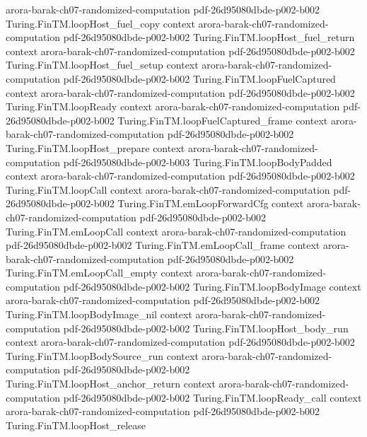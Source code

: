 \begin{theorem}
  {arora-barak-ch07-randomized-computation}
  {pdf-26d95080dbde-p002-b002}
\proofstep
  {Turing.FinTM.loopHost_fuel_copy}
  {context}
  {arora-barak-ch07-randomized-computation}
  {pdf-26d95080dbde-p002-b002}
\proofstep
  {Turing.FinTM.loopHost_fuel_return}
  {context}
  {arora-barak-ch07-randomized-computation}
  {pdf-26d95080dbde-p002-b002}
\proofstep
  {Turing.FinTM.loopHost_fuel_setup}
  {context}
  {arora-barak-ch07-randomized-computation}
  {pdf-26d95080dbde-p002-b002}
\proofstep
  {Turing.FinTM.loopFuelCaptured}
  {context}
  {arora-barak-ch07-randomized-computation}
  {pdf-26d95080dbde-p002-b002}
\proofstep
  {Turing.FinTM.loopReady}
  {context}
  {arora-barak-ch07-randomized-computation}
  {pdf-26d95080dbde-p002-b002}
\proofstep
  {Turing.FinTM.loopFuelCaptured_frame}
  {context}
  {arora-barak-ch07-randomized-computation}
  {pdf-26d95080dbde-p002-b002}
\proofstep
  {Turing.FinTM.loopHost_prepare}
  {context}
  {arora-barak-ch07-randomized-computation}
  {pdf-26d95080dbde-p002-b003}
\proofstep
  {Turing.FinTM.loopBodyPadded}
  {context}
  {arora-barak-ch07-randomized-computation}
  {pdf-26d95080dbde-p002-b002}
\proofstep
  {Turing.FinTM.loopCall}
  {context}
  {arora-barak-ch07-randomized-computation}
  {pdf-26d95080dbde-p002-b002}
\proofstep
  {Turing.FinTM.emLoopForwardCfg}
  {context}
  {arora-barak-ch07-randomized-computation}
  {pdf-26d95080dbde-p002-b002}
\proofstep
  {Turing.FinTM.emLoopCall}
  {context}
  {arora-barak-ch07-randomized-computation}
  {pdf-26d95080dbde-p002-b002}
\proofstep
  {Turing.FinTM.emLoopCall_frame}
  {context}
  {arora-barak-ch07-randomized-computation}
  {pdf-26d95080dbde-p002-b002}
\proofstep
  {Turing.FinTM.emLoopCall_empty}
  {context}
  {arora-barak-ch07-randomized-computation}
  {pdf-26d95080dbde-p002-b002}
\proofstep
  {Turing.FinTM.loopBodyImage}
  {context}
  {arora-barak-ch07-randomized-computation}
  {pdf-26d95080dbde-p002-b002}
\proofstep
  {Turing.FinTM.loopBodyImage_nil}
  {context}
  {arora-barak-ch07-randomized-computation}
  {pdf-26d95080dbde-p002-b002}
\proofstep
  {Turing.FinTM.loopHost_body_run}
  {context}
  {arora-barak-ch07-randomized-computation}
  {pdf-26d95080dbde-p002-b002}
\proofstep
  {Turing.FinTM.loopBodySource_run}
  {context}
  {arora-barak-ch07-randomized-computation}
  {pdf-26d95080dbde-p002-b002}
\proofstep
  {Turing.FinTM.loopHost_anchor_return}
  {context}
  {arora-barak-ch07-randomized-computation}
  {pdf-26d95080dbde-p002-b002}
\proofstep
  {Turing.FinTM.loopReady_call}
  {context}
  {arora-barak-ch07-randomized-computation}
  {pdf-26d95080dbde-p002-b002}
\proofstep
  {Turing.FinTM.loopHost_release}

\end{theorem}
